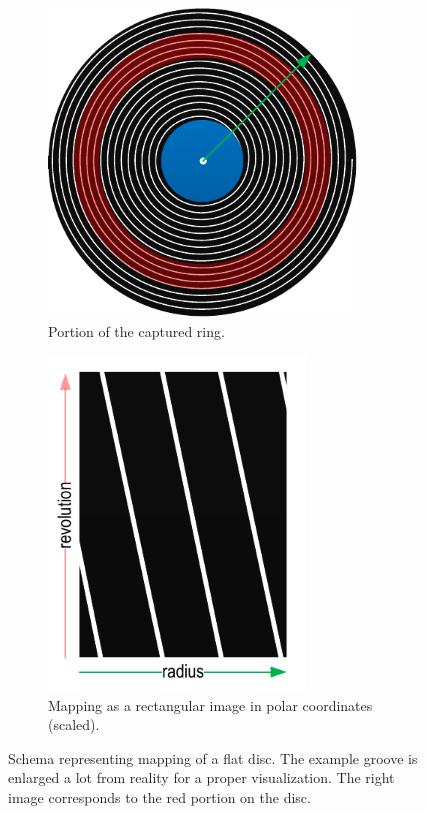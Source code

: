 \begin{figure}[!ht]
    \begin{subfigure}[t]{0.48\textwidth}
    \centering
    \includegraphics[width=0.9\textwidth]{images/mapping-disc-orig}
    \caption{Portion of the captured ring.}
    \label{fig:discmappingorig}
    \end{subfigure}
    \begin{subfigure}[t]{0.48\textwidth}
    \centering
    \includegraphics[width=0.75\textwidth]{images/mapping-disc-img}
    \caption{Mapping as a rectangular image in polar coordinates (scaled).}
    \label{fig:discmappingimage}
    \end{subfigure}
    \caption[Schema representing mapping of a flat disc.]
    {Schema representing mapping of a flat disc. The example groove is enlarged a lot from reality for a proper visualization. The right image corresponds to the red portion on the disc.}
    \label{fig:discmapping}
\end{figure}

